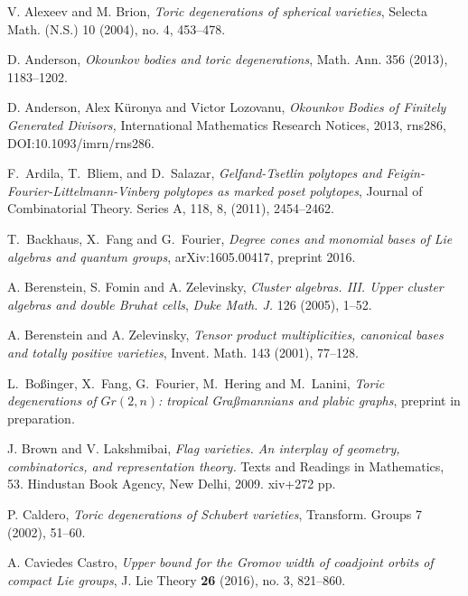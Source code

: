 \documentclass{emsprocart}
\theoremstyle{definition}
\begin{document}
\frenchspacing
\begin{thebibliography}{7}

V. Alexeev and M. Brion,
{\it Toric degenerations of spherical varieties},
Selecta Math. (N.S.) 10 (2004), no. 4, 453--478.

D. Anderson, {\it Okounkov bodies and toric degenerations}, Math. Ann. 356 (2013), 1183--1202.

D. Anderson, Alex K\"uronya and Victor Lozovanu,
\emph{Okounkov Bodies of Finitely Generated Divisors,} International Mathematics Research Notices, 2013, rns286, DOI:10.1093/imrn/rns286.

F.~Ardila, T.~Bliem, and D.~Salazar, {\it Gelfand-{T}setlin polytopes and {F}eigin-{F}ourier-{L}ittelmann-{V}inberg polytopes as marked poset polytopes}, Journal of Combinatorial Theory. Series A, 118, 8, (2011), 2454--2462.


T.~Backhaus, X.~Fang and G.~Fourier,
{\it Degree cones and monomial bases of Lie algebras and quantum groups}, arXiv:1605.00417, preprint 2016.

A. Berenstein, S. Fomin and A. Zelevinsky, \textit{Cluster algebras. III. Upper cluster algebras and double Bruhat cells}, 
{\it Duke Math. J.} 126 (2005), 1--52.

A. Berenstein and A. Zelevinsky,
{\it Tensor product multiplicities, canonical bases and totally positive varieties},
Invent. Math. 143 (2001), 77--128.

L.~Bo\ss inger, X.~Fang, G.~Fourier, M.~Hering and M.~Lanini,
{\it Toric degenerations of $Gr(2,n)$: tropical Gra\ss mannians and plabic graphs},
preprint in preparation.

 J. Brown and V. Lakshmibai,
\textit{\it Flag varieties. An interplay of geometry, combinatorics, and representation theory.}
Texts and Readings in Mathematics, 53. Hindustan Book Agency, New Delhi, 2009. xiv+272 pp.

P. Caldero, {\it Toric degenerations of Schubert varieties}, Transform. Groups 7 (2002), 51--60.

A. Caviedes Castro, 
\emph{Upper bound for the Gromov width of coadjoint orbits of compact Lie groups},
{J. Lie Theory} {\bf 26} (2016), no. 3, 821--860. 


\end{thebibliography}
\end{document}
